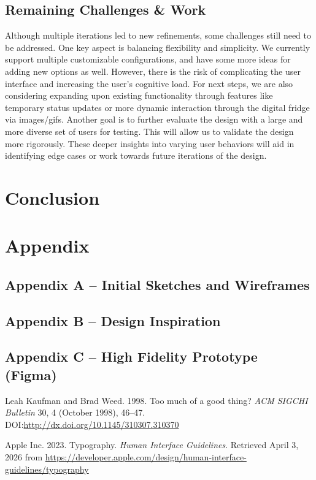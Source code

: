 \documentclass[sigconf]{acmart}
\begin{document}
\subsection{Remaining Challenges \& Work}
Although multiple iterations led to new refinements, some challenges still need to be addressed. One key aspect is balancing flexibility and simplicity. We currently support multiple customizable configurations, and have some more ideas for adding new options as well. However, there is the risk of complicating the user interface and increasing the user's cognitive load. For next steps, we are also considering expanding upon existing functionality through features like temporary status updates or more dynamic interaction through the digital fridge via images/gifs. Another goal is to further evaluate the design with a large and more diverse set of users for testing. This will allow us to validate the design more rigorously. These deeper insights into varying user behaviors will aid in identifying edge cases or work towards future iterations of the design.


\section{Conclusion}


\section*{Appendix}

\subsection*{Appendix A -- Initial Sketches and Wireframes}

\subsection*{Appendix B -- Design Inspiration}

\subsection*{Appendix C -- High Fidelity Prototype (Figma)}




\begin{thebibliography}{}

Leah Kaufman and Brad Weed. 1998. Too much of a good thing? \textit{ACM SIGCHI Bulletin} 30, 4 (October 1998), 46--47. DOI:\url{http://dx.doi.org/10.1145/310307.310370}

Apple Inc. 2023. Typography. \textit{Human Interface Guidelines}. Retrieved April 3, 2026 from \url{https://developer.apple.com/design/human-interface-guidelines/typography}

\end{thebibliography}
\end{document}
